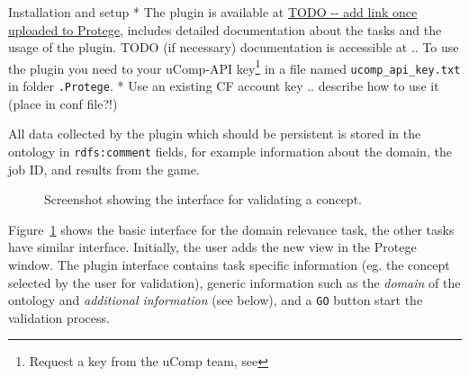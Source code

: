 Installation and setup
* The plugin is available at \url{TODO -- add link once uploaded to Protege}, includes detailed documentation about the tasks and 
the usage of the plugin. TODO (if necessary) documentation is accessible at ..
To use the plugin you need to your uComp-API key\footnote{Request a key from the uComp team, see } in a file named \texttt{ucomp\_api\_key.txt} in folder \texttt{.Protege}.
* Use an existing CF account key .. describe how to use it (place in conf file?!)

 All data collected by the plugin which should be persistent is stored in the ontology in \texttt{rdfs:comment} fields,
for example information about the domain, the job ID, and results from the game.

\begin{figure}[htb]
\centering
{\centering {}}
 \caption{\label{fig:screen_cr}Screenshot showing the interface for validating a concept.}
\end{figure}

Figure~\ref{fig:screen_cr} shows the basic interface for the domain relevance task, the other tasks
have similar interface.
Initially, the user adds the new view in the Protege window. The plugin interface contains 
task specific information (eg. the concept selected by the user for validation), 
generic information such as the \emph{domain} of the ontology and \emph{additional information} (see below),
and a \texttt{GO} button start the validation process.


